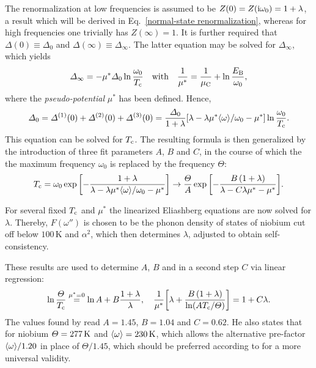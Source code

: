 The renormalization at low frequencies is assumed to be $Z(0) = Z(\mathrm i \omega_0) =
1 + \lambda$, a result which will be derived in Eq.~\ref{normal-state
renormalization}, whereas for high frequencies one trivially has $Z(\infty) =
1$. It is further required that $\Delta(0) \equiv \Delta_0$ and $\Delta(\infty)
\equiv \Delta_\infty$. The latter equation may be solved for $\Delta_\infty$,
which yields
%
\begin{equation} \label{McMillan's Coulomb pseudo-potential}
    \varDelta_\infty = -\mu^* \varDelta_0 \ln \frac{\omega_0}{T \sb{\text{c}}}
    \quad \text{with} \quad
    \frac 1 {\mu^*} = \frac 1 {\mu \sb{\text{C}}} + \ln \frac{E \sb{\text{B}}}{\omega_0},
\end{equation}
%
where the \emph{ pseudo-potential} $\mu^*$ has been defined.
Hence,
%
\begin{equation*}
    \varDelta_0 = \varDelta^{(1)}(0) + \varDelta^{(2)}(0) + \varDelta^{(3)}(0)
    = \frac{\varDelta_0}{1 + \lambda}
    [\lambda - \lambda \mu^* \langle\omega\rangle / \omega_0 - \mu^*]
    \ln \frac{\omega_0}{T \sb{\text{c}}}.
\end{equation*}
%
This equation can be solved for $T \sb{\text{c}}$. The resulting formula is then
generalized by the introduction of three fit parameters $A$, $B$ and $C$, in the
course of which the the maximum frequency $\omega_0$ is replaced by the
 frequency $\Theta$:
%
\begin{equation*}
    T \sb{\text{c}} = \omega_0 \exp \bigg[ {-\frac
        {1 + \lambda}
        {\lambda - \lambda \mu^* \langle\omega\rangle / \omega_0 - \mu^*}}
    \bigg]
    \rightarrow \frac {\varTheta} A \exp \bigg[ {-\frac
        {B \, (1 + \lambda)}
        {\lambda - C \lambda \mu^* - \mu^*}}
    \bigg].
\end{equation*}

For several fixed $T \sb{\text{c}}$ and $\mu^*$ the linearized Eliashberg equations are
now solved for $\lambda$. Thereby, $F(\omega'')$ is chosen to be the phonon
density of states of niobium \cite{NakagawaWoods63} cut off below
$100\,\mathrm{K}$ and $\alpha^2$, which then determines $\lambda$, adjusted to
obtain self-consistency.

These results are used to determine $A$, $B$ and in a second step $C$ via linear
regression:
%
\begin{equation*}
    \ln \frac {\varTheta} {T \sb{\text{c}}} \overset{\mu^* = 0}
    = \ln A + B \frac{1 + \lambda}{\lambda},
    \quad
    \frac 1 {\mu^*} \bigg[
        \lambda + \frac{B \, (1 + \lambda)}{\ln (A T \sb{\text{c}} / \varTheta)}
    \bigg] = 1 + C \lambda.
\end{equation*}
%
The values found by  read $A = 1.45$, $B = 1.04$ and $C = 0.62$.
He also states that for niobium $\varTheta = 277\,\mathrm K$ and $\langle\omega\rangle =
230\,\mathrm K$, which allows the alternative pre-factor $\langle\omega\rangle / 1.20$ in
place of $\Theta / 1.45$, which should be preferred according to 
\cite{Dynes72} for a more universal validity.

